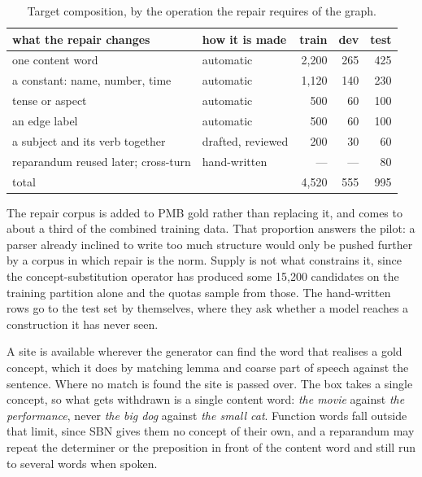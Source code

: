 \documentclass{article}
\begin{document}
\begin{table}[h]
\centering
\small
\begin{tabular}{llrrr}
\toprule
what the repair changes & how it is made & train & dev & test \\
\midrule
one content word                    & automatic          & 2,200 & 265 & 425 \\
a constant: name, number, time      & automatic          & 1,120 & 140 & 230 \\
tense or aspect                     & automatic          &   500 &  60 & 100 \\
an edge label                       & automatic          &   500 &  60 & 100 \\
a subject and its verb together     & drafted, reviewed  &   200 &  30 &  60 \\
reparandum reused later; cross-turn & hand-written       &   --- & --- &  80 \\
\midrule
total & & 4,520 & 555 & 995 \\
\bottomrule
\end{tabular}
\caption{Target composition, by the operation the repair requires of the graph.}
\label{tab:grid}
\end{table}

The repair corpus is added to PMB gold rather than replacing it, and comes to
about a third of the combined training data. That proportion answers the pilot: a
parser already inclined to write too much structure would only be pushed further
by a corpus in which repair is the norm. Supply is not what constrains it, since
the concept-substitution operator has produced some 15,200 candidates on the
training partition alone and the quotas sample from those. The hand-written rows
go to the test set by themselves, where they ask whether a model reaches a
construction it has never seen.

A site is available wherever the generator can find the word that realises a gold
concept, which it does by matching lemma and coarse part of speech against the
sentence. Where no match is found the site is passed over. The
 box takes a single concept, so what gets withdrawn is a
single content word: \textit{the movie} against \textit{the performance}, never
\textit{the big dog} against \textit{the small cat}. Function words fall outside
that limit, since SBN gives them no concept of their own, and a reparandum may
repeat the determiner or the preposition in front of the content word and still
run to several words when spoken.
\end{document}
